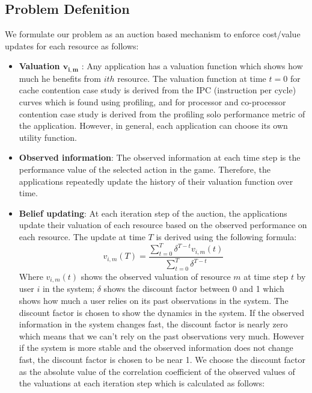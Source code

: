\subsection{Problem Defenition} 
\indent We formulate our problem as an auction based mechanism to enforce cost/value updates for each resource as follows: \\
\begin{itemize}
  \item \textbf{Valuation $\mathbf{v_{i,m}}$} : Any application has a valuation function which shows how much he benefits from $i th$ resource. The valuation function at time $t=0$ for cache contention case study is derived from the IPC (instruction per cycle) curves which is found using profiling, and for processor and co-processor contention case study is derived from the profiling solo performance metric of the application. However, in general, each application can choose its own utility function.  
    \item \textbf{Observed information}: The observed information at each time step is the performance value of the selected action in the game. Therefore, the applications repeatedly update the history of their valuation function over time.  
    \item \textbf{Belief updating}: At each iteration step of the auction, the applications update their valuation of each resource based on the observed performance on each resource. The update at time $T$ is derived using the following formula:
\begin{equation}\label{eq:belief}
v_{i,m}(T)=\frac{\sum\limits_{t=0}^T {\delta}^{T-t}  v_{i,m}(t)}{\sum\limits_{t=0}^T {\delta}^{T-t}} 
\end{equation}  
Where $v_{i,m}(t)$ shows the observed valuation of resource $m$ at time step $t$ by user $i$ in the system; $\delta$ shows the discount factor between 0 and 1 which shows how much a user relies on its past observations in the system. The discount factor is chosen to show the dynamics in the system. If the observed information in the system changes fast, the discount factor is nearly zero which means that we can't rely on the past observations very much. However if the system is more stable and the observed information does not change fast, the discount factor is chosen to be near 1. We choose the discount factor as the absolute value of the correlation coefficient of the observed values of the valuations at each iteration step which is calculated as follows:

\end{itemize}
